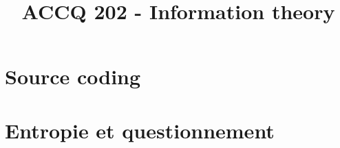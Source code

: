 \documentclass[a4paper,9pt]{article}
\title{\vspace{-1.2cm} ACCQ 202 - Information theory}
\begin{document}
\maketitle

\vspace{-1.5cm}

\section{Source coding}

	

\section{Entropie et questionnement}

	
\end{document}
